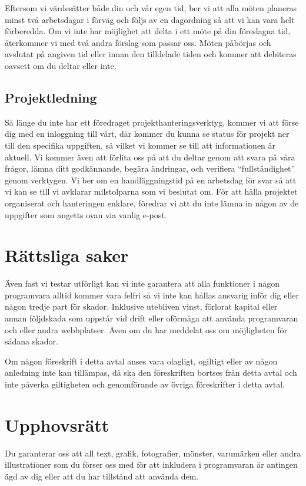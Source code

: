 \documentclass[10pt,a4paper,parskip]{scrartcl}
\begin{document}
Eftersom vi värdesätter både din och vår egen tid, ber vi att alla möten
planeras minst två arbetsdagar i förväg och följs av en dagordning så att vi
kan vara helt förberedda. Om vi inte har möjlighet att delta i ett möte på din
föreslagna tid, återkommer vi med två andra förslag som passar oss. Möten
påbörjas och avslutat på angiven tid eller innan den tilldelade tiden och
kommer att debiteras oavsett om du deltar eller inte.

\subsection{Projektledning}

Så länge du inte har ett föredraget projekthanteringsverktyg, kommer vi att
förse dig med en inloggning till vårt, där kommer du kunna se status för
projekt ner till den specifika uppgiften, så vilket vi kommer se till att
informationen är aktuell. Vi kommer även att förlita oss på att du deltar genom
att svara på våra frågor, lämna ditt godkännande, begära ändringar, och
verifiera “fullständighet” genom verktygen. Vi ber om en handläggningstid på en
arbetsdag för svar så att vi kan se till vi avklarar milstolparna som vi
beslutat om. För att hålla projektet organiserat och hanteringen enklare,
föredrar vi att du inte lämna in någon av de uppgifter som angetts ovan via
vanlig e-post.

\section{Rättsliga saker}
Även fast vi testar utförligt kan vi inte garantera att alla funktioner i någon
programvara alltid  kommer vara felfri så vi inte kan hållas ansvarig inför dig
eller någon tredje part för skador. Inklusive utebliven vinst, förlorat kapital
eller annan följdskada som uppstår vid drift eller oförmåga att använda
programvaran och eller andra webbplatser. Även om du har meddelat oss om
möjligheten för sådana skador.

Om någon föreskrift i detta avtal anses vara olagligt, ogiltigt eller av någon
anledning inte kan tillämpas, då ska den föreskriften bortses från detta avtal
och inte påverka giltigheten och genomförande av övriga föreskrifter i detta
avtal.


\section{Upphovsrätt}
Du garanterar oss att all text, grafik, fotografier, mönster, varumärken eller
andra illustrationer som du förser oss med för att inkludera i programvaran är
antingen ägd av dig eller att du har tillstånd att använda dem.
\end{document}
